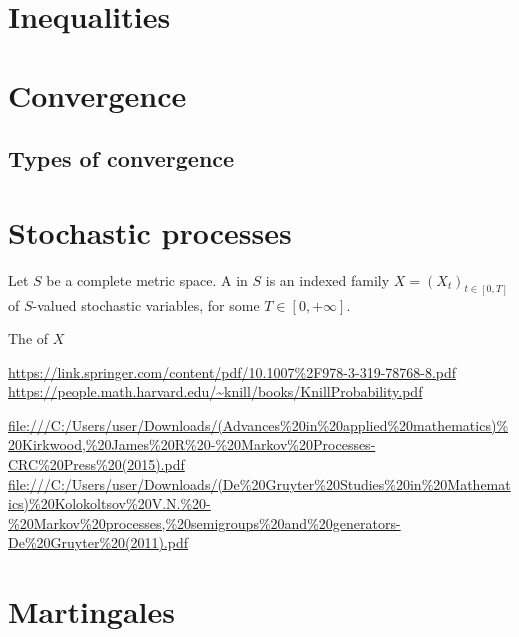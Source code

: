 \chapter{Inequalities}

\chapter{Convergence}
\section{Types of convergence}

\chapter{Stochastic processes}
\begin{definition}
Let $S$ be a complete metric space. A  in $S$ is an indexed family $X = (X_t)_{t\in[0,T]}$ of $S$-valued stochastic variables, for some $T\in [0,+\infty]$.

The  of $X$ 
\end{definition}

\url{https://link.springer.com/content/pdf/10.1007%2F978-3-319-78768-8.pdf}
\url{https://people.math.harvard.edu/~knill/books/KnillProbability.pdf}

\url{file:///C:/Users/user/Downloads/(Advances%20in%20applied%20mathematics)%20Kirkwood,%20James%20R%20-%20Markov%20Processes-CRC%20Press%20(2015).pdf}
\url{file:///C:/Users/user/Downloads/(De%20Gruyter%20Studies%20in%20Mathematics)%20Kolokoltsov%20V.N.%20-%20Markov%20processes,%20semigroups%20and%20generators-De%20Gruyter%20(2011).pdf}


\chapter{Martingales}